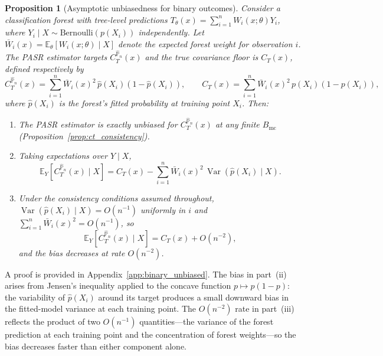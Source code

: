 \documentclass[11pt]{article}
\theoremstyle{plain}
\newtheorem{proposition}{Proposition}
\theoremstyle{definition}
\theoremstyle{remark}
\DeclareMathOperator{\Var}{Var}
\begin{document}
\begin{proposition}[Asymptotic unbiasedness for binary outcomes]
	\label{prop:binary_unbiased}
	Consider a classification forest with tree-level predictions $T_\theta(x) = \sum_{i=1}^n W_i(x;\theta) Y_i$, where $Y_i \mid X \sim \mathrm{Bernoulli}(p(X_i))$ independently. Let $\bar{W}_i(x) = \mathbb{E}_\theta[W_i(x;\theta) \mid X]$ denote the expected forest weight for observation $i$. The PASR estimator targets $C_T^{\widehat{\mathbb{P}}_n}(x)$ and the true covariance floor is $C_T(x)$, defined respectively by
	\[
	C_T^{\widehat{\mathbb{P}}_n}(x) = \sum_{i=1}^n \bar{W}_i(x)^2 \, \hat{p}(X_i)(1 - \hat{p}(X_i)), \qquad C_T(x) = \sum_{i=1}^n \bar{W}_i(x)^2 \, p(X_i)(1 - p(X_i)),
	\]
	where $\hat{p}(X_i)$ is the forest's fitted probability at training point $X_i$. Then:
	\begin{enumerate}
		\item[\textnormal{(i)}] The PASR estimator is exactly unbiased for $C_T^{\widehat{\mathbb{P}}_n}(x)$ at any finite $B_{\mathrm{mc}}$ (Proposition~\ref{prop:ct_consistency}).
		\item[\textnormal{(ii)}] Taking expectations over $Y \mid X$,
		\[
		\mathbb{E}_Y\!\left[C_T^{\widehat{\mathbb{P}}_n}(x) \mid X\right]
		= C_T(x) - \sum_{i=1}^n \bar{W}_i(x)^2 \, \Var\!\left(\hat{p}(X_i) \mid X\right).
		\]
		\item[\textnormal{(iii)}] Under the consistency conditions assumed throughout, $\Var(\hat{p}(X_i) \mid X) = O(n^{-1})$ uniformly in $i$ and $\sum_{i=1}^n \bar{W}_i(x)^2 = O(n^{-1})$, so
		\[
		\mathbb{E}_Y\!\left[C_T^{\widehat{\mathbb{P}}_n}(x) \mid X\right] = C_T(x) + O(n^{-2}),
		\]
		and the bias decreases at rate $O(n^{-2})$.
	\end{enumerate}
\end{proposition}

A proof is provided in Appendix~\ref{app:binary_unbiased}. The bias in part~(ii) arises from Jensen's inequality applied to the concave function $p \mapsto p(1-p)$: the variability of $\hat{p}(X_i)$ around its target produces a small downward bias in the fitted-model variance at each training point. The $O(n^{-2})$ rate in part~(iii) reflects the product of two $O(n^{-1})$ quantities---the variance of the forest prediction at each training point and the concentration of forest weights---so the bias decreases faster than either component alone.
\end{document}
